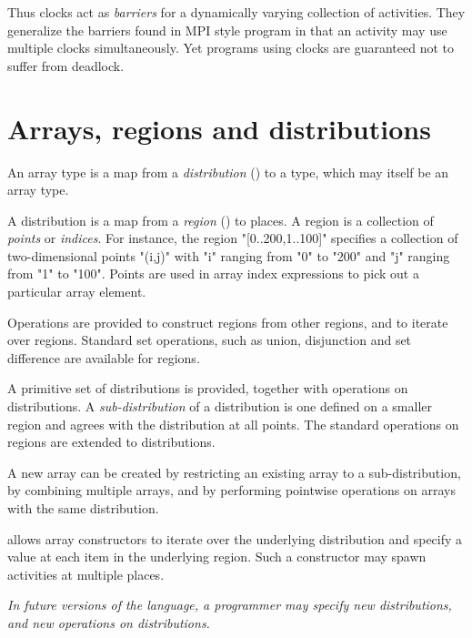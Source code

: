 Thus clocks act as \emph{barriers} for a dynamically varying collection
of activities. They generalize the barriers found in MPI style program
in that an activity may use multiple clocks simultaneously. Yet
programs using clocks are guaranteed not to suffer from
deadlock.


\section{Arrays, regions and distributions}

An \Xten{} array type is a map from a \emph{distribution}
() to a type, which may itself be an
array type.

A distribution is a map from a \emph{region} () to
places.  A region is a collection of \emph{points} or
\emph{indices}. For instance, the region \xcd"[0..200,1..100]" specifies
a collection of two-dimensional points \xcd"(i,j)" with 
\xcd"i" ranging from \xcd"0" to \xcd"200" and \xcd"j" ranging
from \xcd"1" to \xcd"100". Points are used in array index expressions
to pick out a particular array element.

Operations are provided to construct regions from other regions, and
to iterate over regions. Standard set operations, such as union,
disjunction and set difference are available for regions.

A primitive set of distributions is provided, together with operations
on distributions. A \emph{sub-distribution} of a distribution is one
defined on a smaller region and agrees with the distribution
at all points.  The standard operations on regions are extended to
distributions.


A new array can be created by restricting an existing array to a
sub-distribution, by combining multiple arrays, and by performing
pointwise operations on arrays with the same distribution.

\Xten{} allows array constructors to iterate over the underlying
distribution and specify a value at each item in the underlying
region. Such a constructor may spawn activities at multiple places.

\emph{In future versions of the language, a programmer may specify new
distributions, and new operations on distributions.}

